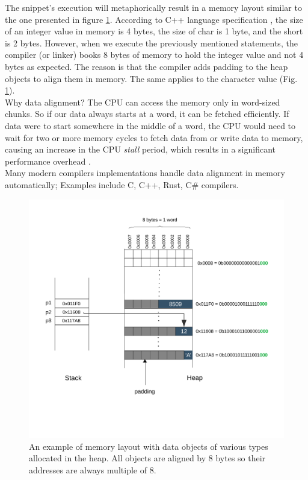 The snippet's execution will metaphorically result in a memory layout similar to the one presented in figure \ref{fig:data_aligntment}. According to C++ language specification \cite{cpp}, the size of an integer value in memory is 4 bytes, the size of char is 1 byte, and the short is 2 bytes. However, when we execute the previously mentioned statements, the compiler (or linker) books 8 bytes of memory to hold the integer value and not 4 bytes as expected. The reason is that the compiler adds padding to the heap objects to align them in memory. The same applies to the character value (Fig. \ref{fig:data_aligntment}).  \\

Why data alignment? The CPU can access the memory only in word-sized chunks. So if our data always starts at a word, it can be fetched efficiently. If data were to start somewhere in the middle of a word, the CPU would need to wait for two or more memory cycles to fetch data from or write data to memory, causing an increase in the CPU \textit{stall} period, which results in a significant performance overhead  \cite{OSConcept}. \\

Many modern compilers implementations handle data alignment in memory automatically; Examples include C, C++, Rust, C\# compilers.

\begin{figure}
	\centering
	\includegraphics[scale=0.8]{figures/chapter2/memorylayout}
	\caption{An example of memory layout with data objects of various types allocated in the heap. All objects are aligned by 8 bytes so their addresses are always multiple of 8.}
	\label{fig:data_aligntment}
\end{figure}

